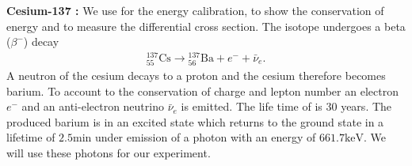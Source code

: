 \vspace{1em}\textbf{Cesium-137 \cite{csPaper}:} We use \Cs for the
energy calibration, to show the conservation of energy and to measure the
differential cross section. The \Cs isotope undergoes a beta ($\beta^-$)
decay
\begin{align}
  {}^{137}_{55} \mathrm{Cs} \longrightarrow {}^{137}_{56} \mathrm{Ba} + e^-
  + \bar{\nu}_e.
  \label{eq:betaM}
\end{align}
A neutron of the cesium decays to a proton and the cesium therefore becomes barium.
To account to the conservation of charge and lepton number an electron $e^-$
and an anti-electron neutrino $\bar{\nu}_e$ is emitted. The life time of \Cs is 30 years.
The produced barium is in an excited state which returns to the ground state in a lifetime of
$2.5 \mathrm{min}$ under emission of a photon with an energy of $661.7 \mathrm{keV}$.
We will use these photons for our experiment.


